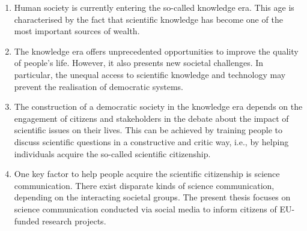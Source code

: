 \begin{enumerate}
 \item Human society is currently entering the so-called knowledge era. This age is characterised by the fact that scientific knowledge has become one of the most important sources of wealth. 
 \item The knowledge era offers unprecedented opportunities to improve the quality of people's life. However, it also presents new societal challenges. In particular, the unequal access to scientific knowledge and technology may prevent the realisation of democratic systems.
 \item The construction of a democratic society in the knowledge era depends on the engagement of citizens and stakeholders in the debate about the impact of scientific issues on their lives. This can be achieved by training people to discuss scientific questions in a constructive and critic way, i.e., by helping individuals acquire the so-called scientific citizenship.
 \item One key factor to help people acquire the scientific citizenship is science communication. There exist disparate kinds of science communication, depending on the interacting societal groups. The present thesis focuses on science communication conducted via social media to inform citizens of EU-funded research projects.     
\end{enumerate}